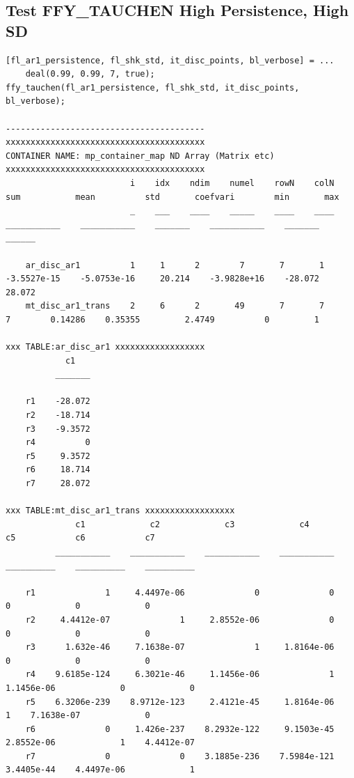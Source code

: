 \documentclass[
]{book}
\begin{document}
\hypertarget{test-ffy_tauchen-high-persistence-high-sd}{%
\subsection{Test FFY\_TAUCHEN High Persistence, High SD}\label{test-ffy_tauchen-high-persistence-high-sd}}

\begin{verbatim}
[fl_ar1_persistence, fl_shk_std, it_disc_points, bl_verbose] = ...
    deal(0.99, 0.99, 7, true);
ffy_tauchen(fl_ar1_persistence, fl_shk_std, it_disc_points, bl_verbose);

----------------------------------------
xxxxxxxxxxxxxxxxxxxxxxxxxxxxxxxxxxxxxxxx
CONTAINER NAME: mp_container_map ND Array (Matrix etc)
xxxxxxxxxxxxxxxxxxxxxxxxxxxxxxxxxxxxxxxx
                         i    idx    ndim    numel    rowN    colN        sum           mean          std       coefvari        min       max  
                         _    ___    ____    _____    ____    ____    ___________    ___________    _______    ___________    _______    ______

    ar_disc_ar1          1     1      2        7       7       1      -3.5527e-15    -5.0753e-16     20.214    -3.9828e+16    -28.072    28.072
    mt_disc_ar1_trans    2     6      2       49       7       7                7        0.14286    0.35355         2.4749          0         1

xxx TABLE:ar_disc_ar1 xxxxxxxxxxxxxxxxxx
            c1   
          _______

    r1    -28.072
    r2    -18.714
    r3    -9.3572
    r4          0
    r5     9.3572
    r6     18.714
    r7     28.072

xxx TABLE:mt_disc_ar1_trans xxxxxxxxxxxxxxxxxx
              c1             c2             c3             c4             c5            c6            c7    
          ___________    ___________    ___________    ___________    __________    __________    __________

    r1              1     4.4497e-06              0              0             0             0             0
    r2     4.4412e-07              1     2.8552e-06              0             0             0             0
    r3      1.632e-46     7.1638e-07              1     1.8164e-06             0             0             0
    r4    9.6185e-124     6.3021e-46     1.1456e-06              1    1.1456e-06             0             0
    r5    6.3206e-239    8.9712e-123     2.4121e-45     1.8164e-06             1    7.1638e-07             0
    r6              0     1.426e-237    8.2932e-122     9.1503e-45    2.8552e-06             1    4.4412e-07
    r7              0              0    3.1885e-236    7.5984e-121    3.4405e-44    4.4497e-06             1


\end{verbatim}
\end{document}

